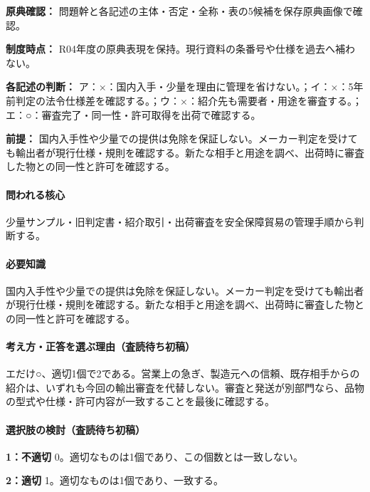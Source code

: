 \noindent\textbf{原典確認：} 問題幹と各記述の主体・否定・全称・表の5候補を保存原典画像で確認。\par

\noindent\textbf{制度時点：} R04年度の原典表現を保持。現行資料の条番号や仕様を過去へ補わない。\par

\noindent\textbf{各記述の判断：} ア：×：国内入手・少量を理由に管理を省けない。；イ：×：5年前判定の法令仕様差を確認する。；ウ：×：紹介先も需要者・用途を審査する。；エ：○：審査完了・同一性・許可取得を出荷で確認する。\par

\noindent\textbf{前提：} 国内入手性や少量での提供は免除を保証しない。メーカー判定を受けても輸出者が現行仕様・規則を確認する。新たな相手と用途を調べ、出荷時に審査した物との同一性と許可を確認する。\par

\paragraph{問われる核心} 少量サンプル・旧判定書・紹介取引・出荷審査を安全保障貿易の管理手順から判断する。

\paragraph{必要知識} 国内入手性や少量での提供は免除を保証しない。メーカー判定を受けても輸出者が現行仕様・規則を確認する。新たな相手と用途を調べ、出荷時に審査した物との同一性と許可を確認する。

\paragraph{考え方・正答を選ぶ理由（査読待ち初稿）} エだけ○、適切1個で2である。営業上の急ぎ、製造元への信頼、既存相手からの紹介は、いずれも今回の輸出審査を代替しない。審査と発送が別部門なら、品物の型式や仕様・許可内容が一致することを最後に確認する。

\paragraph{選択肢の検討（査読待ち初稿）}\mbox{}\par

\noindent\textbf{1：不適切} 0。適切なものは1個であり、この個数とは一致しない。\par

\noindent\textbf{2：適切} 1。適切なものは1個であり、一致する。\par

